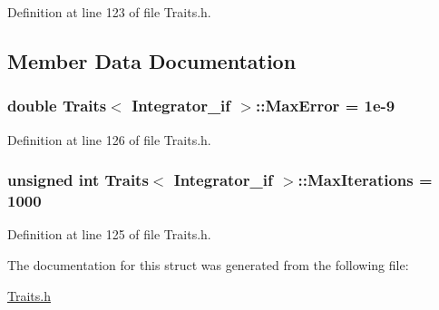 Definition at line 123 of file Traits.\-h.



\subsection{Member Data Documentation}
\hypertarget{struct_traits_3_01_integrator__if_01_4_a32e086683b5e71dd7be4225d717d22a2}{
\subsubsection[{Max\-Error}]{\setlength{\rightskip}{0pt plus 5cm}double {\bf Traits}$<$ {\bf Integrator\-\_\-if} $>$\-::Max\-Error = 1e-\/9}}\label{struct_traits_3_01_integrator__if_01_4_a32e086683b5e71dd7be4225d717d22a2}


Definition at line 126 of file Traits.\-h.

\hypertarget{struct_traits_3_01_integrator__if_01_4_a00ccc8b3ca58fdd91a0b40c59a02879b}{
\subsubsection[{Max\-Iterations}]{\setlength{\rightskip}{0pt plus 5cm}unsigned int {\bf Traits}$<$ {\bf Integrator\-\_\-if} $>$\-::Max\-Iterations = 1000}}\label{struct_traits_3_01_integrator__if_01_4_a00ccc8b3ca58fdd91a0b40c59a02879b}


Definition at line 125 of file Traits.\-h.



The documentation for this struct was generated from the following file\-:\begin{DoxyCompactItemize}
\item 
\hyperlink{_traits_8h}{Traits.\-h}\end{DoxyCompactItemize}
